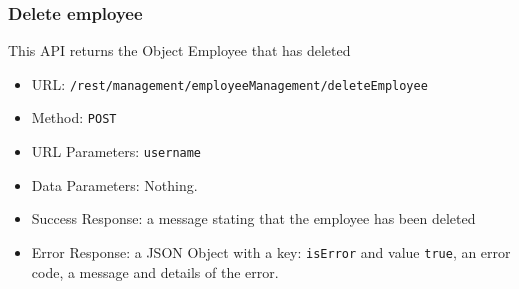 \subsubsection*{Delete employee}
This API returns the Object Employee that has deleted
\begin{itemize}
    \item URL: \texttt{/rest/management/employeeManagement/deleteEmployee}
    \item Method: \texttt{POST}
    \item URL Parameters: \texttt{username}
    \item Data Parameters: Nothing.
    \item Success Response: a message stating that the employee has been deleted
    \item Error Response: a JSON Object with a key: \texttt{isError}  and value \texttt{true}, an error code, a message and details of the error.
\end{itemize}